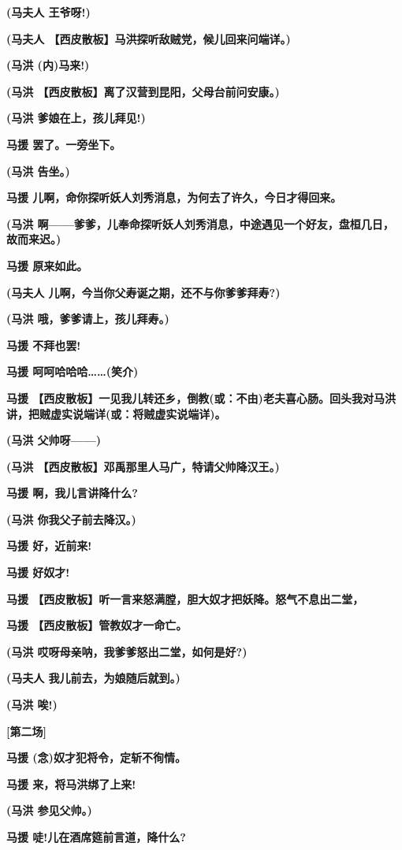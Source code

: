 \textbf{(马夫人 王爷呀!)}

\textbf{(马夫人 【西皮散板】马洪探听敌贼党，候儿回来问端详。)}

\textbf{(马洪 (内)马来!)}

\textbf{(马洪 【西皮散板】离了汉营到昆阳，父母台前问安康。)}

\textbf{(马洪 爹娘在上，孩儿拜见!)}

\textbf{马援 罢了。一旁坐下。}

\textbf{(马洪 告坐。)}

\textbf{马援 儿啊，命你探听妖人刘秀消息，为何去了许久，今日才得回来。}

\textbf{(马洪
啊------爹爹，儿奉命探听妖人刘秀消息，中途遇见一个好友，盘桓几日，故而来迟。)}

\textbf{马援 原来如此。}

\textbf{(马夫人 儿啊，今当你父寿诞之期，还不与你爹爹拜寿?)}

\textbf{(马洪 哦，爹爹请上，孩儿拜寿。)}

\textbf{马援 不拜也罢!}

\textbf{马援 呵呵哈哈哈\ldots{}\ldots{}(笑介)}

\textbf{马援
【西皮散板】一见我儿转还乡，倒教(或：不由)老夫喜心肠。回头我对马洪讲，把贼虚实说端详(或：将贼虚实说端详)。}

\textbf{(马洪 父帅呀------)}

\textbf{(马洪 【西皮散板】邓禹那里人马广，特请父帅降汉王。)}

\textbf{马援 啊，我儿言讲降什么?}

\textbf{(马洪 你我父子前去降汉。)}

\textbf{马援 好，近前来!}

\textbf{马援 好奴才!}

\textbf{马援
【西皮散板】听一言来怒满膛，胆大奴才把妖降。怒气不息出二堂，}

\textbf{马援 【西皮散板】管教奴才一命亡。}

\textbf{(马洪 哎呀母亲呐，我爹爹怒出二堂，如何是好?)}

\textbf{(马夫人 我儿前去，为娘随后就到。)}

\textbf{(马洪 唉!)}

\textbf{{[}第二场{]}}

\textbf{马援 (念)奴才犯将令，定斩不徇情。}

\textbf{马援 来，将马洪绑了上来!}

\textbf{(马洪 参见父帅。)}

\textbf{马援 唗!儿在酒席筵前言道，降什么?}

